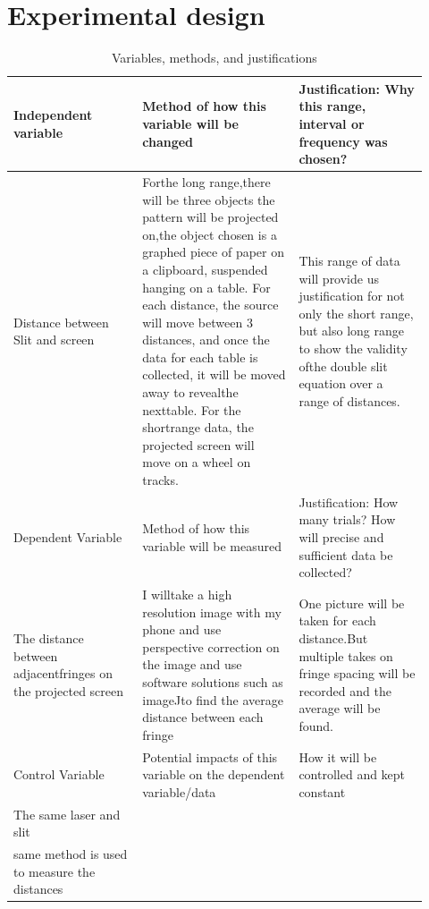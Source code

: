 
\section{Experimental design}
\begin{longtable}{p{0.29\linewidth}p{0.34\linewidth}p{0.29\linewidth}}
\caption{Variables, methods, and justifications}\label{tab:variables}\\
\hline
Independent variable & Method of how this variable will be changed & Justification: Why this range, interval or frequency was chosen? \\
\hline
Distance between Slit and screen & Forthe long range,there will be three objects the pattern will be projected on,the object chosen is a graphed piece of paper on a clipboard, suspended hanging on a table. For each distance, the source will move between 3 distances, and once the data for each table is collected, it will be moved away to revealthe nexttable. For the shortrange data, the projected screen will move on a wheel on tracks. & This range of data will provide us justification for not only the short range, but also long range to show the validity ofthe double slit equation over a range of distances. \\
Dependent Variable & Method of how this variable will be measured & Justification: How many trials? How will precise and sufficient data be collected? \\
The distance between adjacentfringes on the projected screen & I willtake a high resolution image with my phone and use perspective correction on the image and use software solutions such as imageJto find the average distance between each fringe & One picture will be taken for each distance.But multiple takes on fringe spacing will be recorded and the average will be found. \\
Control Variable & Potential impacts of this variable on the dependent variable/data & How it will be controlled and kept constant \\
The same laser and slit &  &  \\
same method is used to measure the distances &  &  \\
\hline
\end{longtable}


